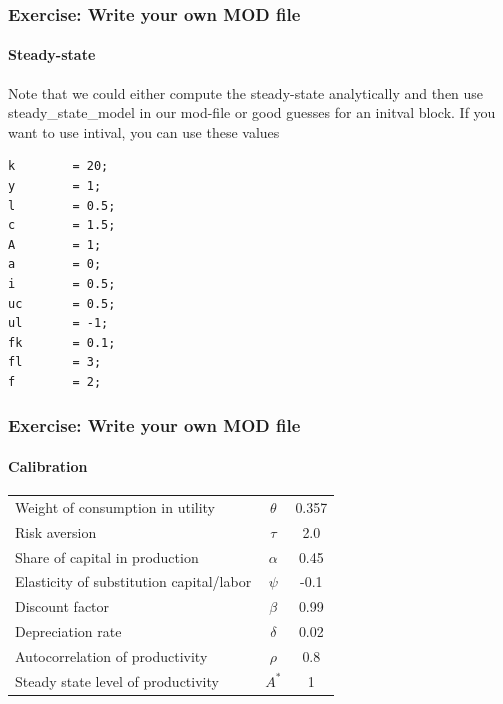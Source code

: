 \documentclass[handout]{beamer}  %
\begin{document}
\begin{frame}[fragile]\frametitle{Exercise: Write your own MOD file}\framesubtitle{Steady-state}
Note that we could either compute the steady-state analytically and then use steady\_state\_model in our mod-file or good guesses for an initval block. If you want to use intival, you can use these values
\begin{verbatim}
k  		 = 20;
y  		 = 1;
l  		 = 0.5;
c  		 = 1.5;
A  		 = 1;
a  		 = 0;
i  		 = 0.5;
uc 		 = 0.5;
ul 		 = -1;
fk 		 = 0.1;
fl 		 = 3;
f  		 = 2;
\end{verbatim}
\end{frame}


\begin{frame}\frametitle{Exercise: Write your own MOD file}\framesubtitle{Calibration}

\begin{tabular}{lcc}
	 Weight of consumption in utility & $\theta$ & 0.357 \\
	 Risk aversion & $\tau$ & 2.0 \\
	 Share of capital in production & $\alpha$  & 0.45 \\
	 Elasticity of substitution capital/labor & $\psi$ & -0.1 \\
	 Discount factor & $\beta$ & 0.99 \\
	 Depreciation rate & $\delta$ & 0.02 \\
	 Autocorrelation of productivity & $\rho$ & 0.8 \\
	 Steady state level of productivity & $A^{*}$ & 1
\end{tabular}
\end{frame}
\end{document}
